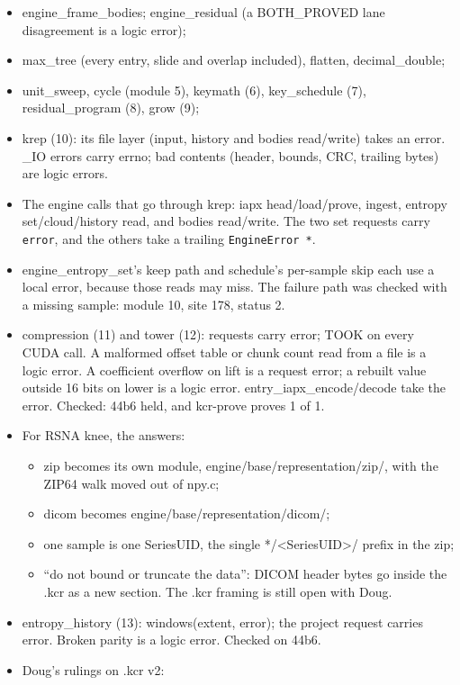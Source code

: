\begin{itemize}
\item engine\_\allowbreak{}frame\_\allowbreak{}bodies; engine\_\allowbreak{}residual (a BOTH\_\allowbreak{}PROVED lane disagreement is a logic error);
\item max\_\allowbreak{}tree (every entry, slide and overlap included), flatten, decimal\_\allowbreak{}double;
\item unit\_\allowbreak{}sweep, cycle (module 5), keymath (6), key\_\allowbreak{}schedule (7), residual\_\allowbreak{}program (8), grow (9);
\item krep (10): its file layer (input, history and bodies read/write) takes an error. \_\allowbreak{}IO errors carry errno; bad contents (header, bounds, CRC, trailing bytes) are logic errors.
\item The engine calls that go through krep: iapx head/load/prove, ingest, entropy set/cloud/history read, and bodies read/write. The two set requests carry \texttt{error}, and the others take a trailing \texttt{Engine\allowbreak{}Error *}.
\item engine\_\allowbreak{}entropy\_\allowbreak{}set's keep path and schedule's per-sample skip each use a local error, because those reads may miss. The failure path was checked with a missing sample: module 10, site 178, status 2.
\item compression (11) and tower (12): requests carry error; TOOK on every CUDA call. A malformed offset table or chunk count read from a file is a logic error. A coefficient overflow on lift is a request error; a rebuilt value outside 16 bits on lower is a logic error. entry\_\allowbreak{}iapx\_\allowbreak{}encode/decode take the error. Checked: 44b6 held, and kcr-prove proves 1 of 1.
\item For RSNA knee, the answers:

\begin{itemize}
\item zip becomes its own module, engine/base/representation/zip/, with the ZIP64 walk moved out of npy.c;
\item dicom becomes engine/base/representation/dicom/;
\item one sample is one SeriesUID, the single */<SeriesUID>/ prefix in the zip;
\item “do not bound or truncate the data”: DICOM header bytes go inside the .kcr as a new section. The .kcr framing is still open with Doug.
\end{itemize}
\item entropy\_\allowbreak{}history (13): windows(extent, error); the project request carries error. Broken parity is a logic error. Checked on 44b6.
\item Doug's rulings on .kcr v2:


\end{itemize}
